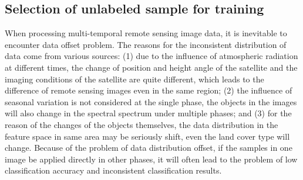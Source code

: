 \documentclass{isprs} %
\begin{document}
\subsection{Selection of unlabeled sample for training}\label{sec:Selection of unlabeled sample for training}

When processing multi-temporal remote sensing image data, it is inevitable to encounter data offset problem. The reasons for the inconsistent distribution of data come from various sources: (1) due to the influence of atmospheric radiation at different times, the change of position and height angle of the satellite and the imaging conditions of the satellite are quite different, which leads to the difference of remote sensing images even in the same region; (2) the influence of seasonal variation is not considered at the single phase, the objects in the images will also change in the spectral spectrum under multiple phases; and (3) for the reason of the changes of the objects themselves, the data distribution in the feature space in same area may be seriously shift, even the land cover type will change. Because of the problem of data distribution offset, if the samples in one image be applied directly in other phases, it will often lead to the problem of low classification accuracy and inconsistent classification results.
\end{document}

